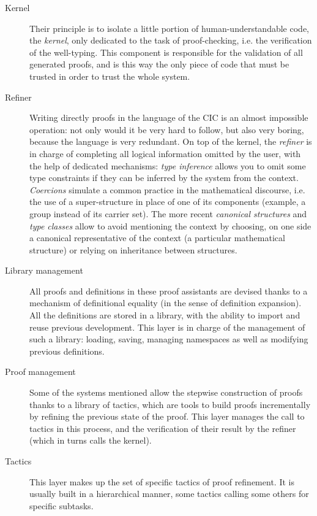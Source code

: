 \documentclass[twoside,a4paper,12pt]{article}
\begin{document}
\begin{description}
\item[Kernel] Their principle is to isolate a little portion of
  human-understandable code, the \emph{kernel}, only dedicated to the
  task of proof-checking, i.e. the verification of the well-typing.
  This component is responsible for the validation of all generated
  proofs, and is this way the only piece of code that must be trusted
  in order to trust the whole system.

\item[Refiner] Writing directly proofs in the language of the CIC is
  an almost impossible operation: not only would it be very hard to
  follow, but also very boring, because the language is very
  redundant. On top of the kernel, the \emph{refiner} is in charge of
  completing all logical information omitted by the user, with the
  help of dedicated mechanisms: \emph{type inference} allows you to
  omit some type constraints if they can be inferred by the system
  from the context. \emph{Coercions} simulate a common practice in the
  mathematical discourse, i.e. the use of a super-structure in place
  of one of its components (example, a group instead of its carrier
  set). The more recent \emph{canonical structures} and \emph{type
    classes} allow to avoid mentioning the context by choosing, on one
  side a canonical representative of the context (a particular
  mathematical structure) or relying on inheritance between
  structures.

\item[Library management] All proofs and definitions in these proof
  assistants are devised thanks to a mechanism of definitional
  equality (in the sense of definition expansion). All the definitions
  are stored in a library, with the ability to import and reuse
  previous development. This layer is in charge of the management of
  such a library: loading, saving, managing namespaces as well as
  modifying previous definitions.

\item[Proof management] Some of the systems mentioned allow the
  stepwise construction of proofs thanks to a library of tactics,
  which are tools to build proofs incrementally by refining the
  previous state of the proof. This layer manages the call to tactics
  in this process, and the verification of their result by the refiner
  (which in turns calls the kernel).

\item[Tactics] This layer makes up the set of specific tactics of
  proof refinement. It is usually built in a hierarchical manner, some
  tactics calling some others for specific subtasks.


\end{description}
\end{document}
